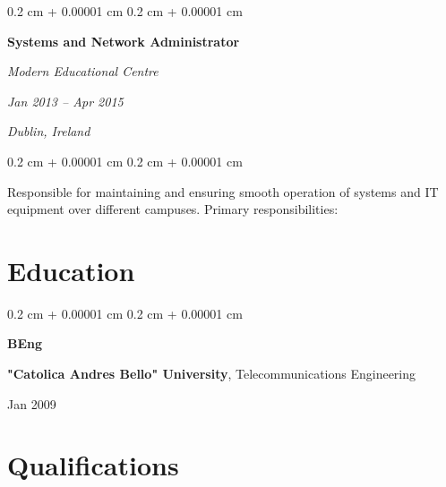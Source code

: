 \documentclass[10pt, a4paper]{article}
\newenvironment{onecolentry}{
    \begin{adjustwidth}{
        0.2 cm + 0.00001 cm
    }{
        0.2 cm + 0.00001 cm
    }
}{
    \end{adjustwidth}
} %
\newenvironment{twocolentry}[2][]{
    \onecolentry
    \def\secondColumn{#2}
    \setcolumnwidth{\fill, 4.5 cm}
    \begin{paracol}{2}
}{
    \switchcolumn \raggedleft \secondColumn
    \end{paracol}
    \endonecolentry
} %
\newenvironment{threecolentry}[3][]{
    \onecolentry
    \def\thirdColumn{#3}
    \setcolumnwidth{1 cm, \fill, 4.5 cm}
    \begin{paracol}{3}
    {\raggedright #2} \switchcolumn
}{
    \switchcolumn \raggedleft \thirdColumn
    \end{paracol}
    \endonecolentry
} %
\begin{document}
        \vspace{0.2 cm}

        \begin{twocolentry}{
        \textit{Jan 2013 – Apr 2015}


        \textit{Dublin, Ireland}}
            \large\textbf{Systems and Network Administrator}
            
            \textit{Modern Educational Centre}
        \end{twocolentry}

        \vspace{0.10 cm}

        \begin{onecolentry}
        Responsible for maintaining and ensuring smooth operation of systems and IT equipment over different campuses. Primary responsibilities:
        \end{onecolentry}

        \vspace{0.10 cm}




    
    \section{Education}



        
        \begin{threecolentry}{\textbf{BEng}}{
            Jan 2009
        }
            \textbf{"Catolica Andres Bello" University}, Telecommunications Engineering
        \end{threecolentry}


    
    \section{Qualifications}
\end{document}
